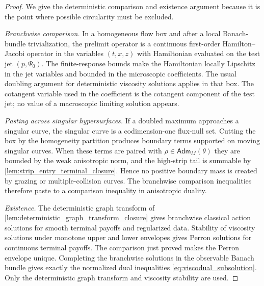 \documentclass[12pt, letterpaper]{amsart}
\newcommand{\Adm}{\mathsf{Adm}}
\theoremstyle{plain}
\theoremstyle{definition}
\theoremstyle{remark}
\begin{document}
\begin{proof}
We give the deterministic comparison and existence argument because it is the
point where possible circularity must be excluded.

\emph{Branchwise comparison.}  In a homogeneous flow box and after a local
Banach-bundle trivialization, the prelimit operator is a continuous first-order
Hamilton--Jacobi operator in the variables $(t,x,z)$ with Hamiltonian evaluated
on the test jet $(p,\Psi_0)$.  The finite-response bounds make the Hamiltonian
locally Lipschitz in the jet variables and bounded in the microscopic
coefficients.  The usual doubling argument for deterministic viscosity
solutions applies in that box.  The cotangent variable used in the coefficient
is the cotangent component of the test jet; no value of a macroscopic limiting
solution appears.

\emph{Pasting across singular hypersurfaces.}  If a doubled maximum approaches a
singular curve, the singular curve is a codimension-one flux-null set.  Cutting
the box by the homogeneity partition produces boundary terms supported on
moving singular curves.  When these terms are paired with
$\rho\in\Adm_M(\theta)$ they are bounded by the weak anisotropic norm, and the
high-strip tail is summable by \cref{lem:strip_entry_terminal_closure}.  Hence
no positive boundary mass is created by grazing or multiple-collision curves.
The branchwise comparison inequalities therefore paste to a comparison
inequality in anisotropic duality.

\emph{Existence.}  The deterministic graph transform of
\cref{lem:deterministic_graph_transform_closure} gives branchwise classical
action solutions for smooth terminal payoffs and regularized data.  Stability of
viscosity solutions under monotone upper and lower envelopes gives Perron
solutions for continuous terminal payoffs.  The comparison just proved makes the
Perron envelope unique.  Completing the branchwise solutions in the observable
Banach bundle gives exactly the normalized dual inequalities
\eqref{eq:viscodual_subsolution}.  Only the deterministic graph transform and viscosity stability are used.
\end{proof}
\end{document}
